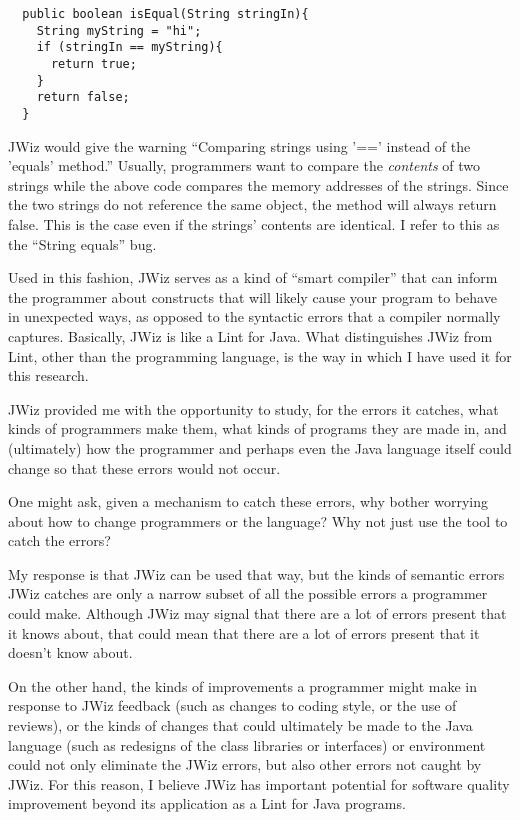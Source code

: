 \begin{verbatim}
  public boolean isEqual(String stringIn){
    String myString = "hi";
    if (stringIn == myString){
      return true;
    }
    return false;
  }
\end{verbatim}

JWiz would give the warning ``Comparing strings using '==' instead of the
'equals' method.''  Usually, programmers want to compare the {\em contents}
of two strings while the above code compares the memory addresses of the
strings.  Since the two strings do not reference the same object, the
method will always return false.  This is the case even if the strings'
contents are identical.  I refer to this as the ``String equals'' bug.

Used in this fashion, JWiz serves as a kind of ``smart compiler'' that can
inform the programmer about constructs that will likely cause your program
to behave in unexpected ways, as opposed to the syntactic errors that a
compiler normally captures.  Basically, JWiz is like a Lint\cite{Darwin88}
for Java. What distinguishes JWiz from Lint, other than the programming
language, is the way in which I have used it for this research.

JWiz provided me with the opportunity to study, for the errors it catches,
what kinds of programmers make them, what kinds of programs they are made
in, and (ultimately) how the programmer and perhaps even the Java language
itself could change so that these errors would not occur.

One might ask, given a mechanism to catch these errors, why bother worrying
about how to change programmers or the language?  Why not just use the tool
to catch the errors?

My response is that JWiz can be used that way, but the kinds of semantic
errors JWiz catches are only a narrow subset of all the possible errors a
programmer could make.  Although JWiz may signal that there are a lot of
errors present that it knows about, that could mean that there are a lot of
errors present that it doesn't know about.

On the other hand, the kinds of improvements a programmer might make in
response to JWiz feedback (such as changes to coding style, or the use of
reviews), or the kinds of changes that could ultimately be made to the Java
language (such as redesigns of the class libraries or interfaces) or
environment could not only eliminate the JWiz errors, but also other errors
not caught by JWiz.  For this reason, I believe JWiz has important
potential for software quality improvement beyond its application as a Lint
for Java programs.

